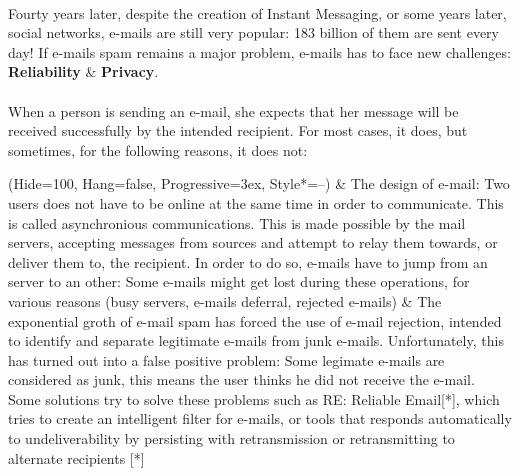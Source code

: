 \paragraph{}
Fourty years later, despite the creation of Instant Messaging, or some years later, social networks, e-mails are still very popular: 183 billion of them are sent every day! If e-mails spam remains a major problem, e-mails has to face new challenges: \textbf{Reliability} \& \textbf{Privacy}. 
\paragraph{}
When a person is sending an e-mail, she expects that her message will be received successfully by the
intended recipient. For most cases, it does, but sometimes, for the following reasons, it does not:
\begin{easylist}[enumerate]
\ListProperties(Hide=100, Hang=false, Progressive=3ex, Style*=--)
& The design of e-mail: Two users does not have to be online at the same time in order to communicate. This is called asynchronious communications. This is made possible by the mail servers, accepting messages from sources and attempt to relay them towards, or deliver them to, the recipient. In order to do so, e-mails have to jump from an server to an other: Some e-mails might get lost during these operations, for various reasons (busy servers, e-mails deferral, rejected e-mails)
& The exponential groth of e-mail spam has forced the use of e-mail rejection, intended to identify and separate legitimate e-mails from junk e-mails. Unfortunately, this has turned out into a false positive problem: Some legimate e-mails are considered as junk, this means the user thinks he did not receive the e-mail.
Some solutions try to solve these problems such as RE: Reliable Email[*], which tries to create an intelligent filter for e-mails, or tools that responds automatically to undeliverability by persisting with retransmission or retransmitting to alternate recipients [*]
\end{easylist}

